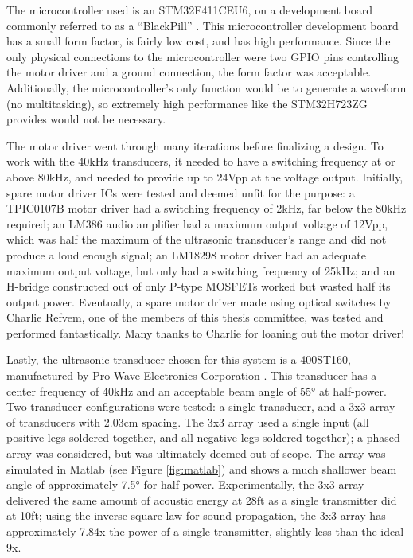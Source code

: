 \documentclass[12pt,a4paper]{report}
\begin{document}
The microcontroller used is an STM32F411CEU6, on a development board commonly referred to as a “BlackPill” \cite{blackpill}. This microcontroller development board has a small form factor, is fairly low cost, and has high performance. Since the only physical connections to the microcontroller were two GPIO pins controlling the motor driver and a ground connection, the form factor was acceptable. Additionally, the microcontroller’s only function would be to generate a waveform (no multitasking), so extremely high performance like the STM32H723ZG provides would not be necessary.

The motor driver went through many iterations before finalizing a design. To work with the 40kHz transducers, it needed to have a switching frequency at or above 80kHz, and needed to provide up to 24Vpp at the voltage output. Initially, spare motor driver ICs were tested and deemed unfit for the purpose: a TPIC0107B motor driver had a switching frequency of 2kHz, far below the 80kHz required; an LM386 audio amplifier had a maximum output voltage of 12Vpp, which was half the maximum of the ultrasonic transducer’s range and did not produce a loud enough signal; an LM18298 motor driver had an adequate maximum output voltage, but only had a switching frequency of 25kHz; and an H-bridge constructed out of only P-type MOSFETs worked but wasted half its output power. Eventually, a spare motor driver made using optical switches by Charlie Refvem, one of the members of this thesis committee, was tested and performed fantastically. Many thanks to Charlie for loaning out the motor driver!

Lastly, the ultrasonic transducer chosen for this system is a 400ST160, manufactured by Pro-Wave Electronics Corporation \cite{400sr160}. This transducer has a center frequency of 40kHz and an acceptable beam angle of 55° at half-power. Two transducer configurations were tested: a single transducer, and a 3x3 array of transducers with 2.03cm spacing. The 3x3 array used a single input (all positive legs soldered together, and all negative legs soldered together); a phased array was considered, but was ultimately deemed out-of-scope. The array was simulated in Matlab (see Figure \ref{fig:matlab}) and shows a much shallower beam angle of approximately 7.5° for half-power. Experimentally, the 3x3 array delivered the same amount of acoustic energy at 28ft as a single transmitter did at 10ft; using the inverse square law for sound propagation, the 3x3 array has approximately 7.84x the power of a single transmitter, slightly less than the ideal 9x.
\end{document}
